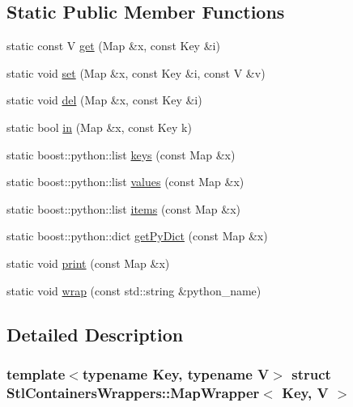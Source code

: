 \subsection*{Static Public Member Functions}
\begin{DoxyCompactItemize}
\item 
static const V \hyperlink{struct_stl_containers_wrappers_1_1_map_wrapper_a07fb2d02f615e98dea6b89eed318cf50}{get} (Map \&x, const Key \&i)
\item 
static void \hyperlink{struct_stl_containers_wrappers_1_1_map_wrapper_a96ea8db6b3798552ac56ba3528338ed1}{set} (Map \&x, const Key \&i, const V \&v)
\item 
static void \hyperlink{struct_stl_containers_wrappers_1_1_map_wrapper_a53d6b96019b6a897857456aeca41e307}{del} (Map \&x, const Key \&i)
\item 
static bool \hyperlink{struct_stl_containers_wrappers_1_1_map_wrapper_adb2320f8f6e103e8e260d8893e447922}{in} (Map \&x, const Key k)
\item 
static boost::python::list \hyperlink{struct_stl_containers_wrappers_1_1_map_wrapper_ac77b18022558a701e72fef0c590a30e5}{keys} (const Map \&x)
\item 
static boost::python::list \hyperlink{struct_stl_containers_wrappers_1_1_map_wrapper_af5fe4cddbd02adae4a550258a397e6a0}{values} (const Map \&x)
\item 
static boost::python::list \hyperlink{struct_stl_containers_wrappers_1_1_map_wrapper_a9aa475b817bbab6bc522b595c7e0a35b}{items} (const Map \&x)
\item 
static boost::python::dict \hyperlink{struct_stl_containers_wrappers_1_1_map_wrapper_ad5e7ad1b461f1693a90fcca938199382}{getPyDict} (const Map \&x)
\item 
static void \hyperlink{struct_stl_containers_wrappers_1_1_map_wrapper_ac055a7e3c344719ff196cc1d146da0a1}{print} (const Map \&x)
\item 
static void \hyperlink{struct_stl_containers_wrappers_1_1_map_wrapper_a1ac7d22751e4a35f84b5c0d5d764529b}{wrap} (const std::string \&python\_\-name)
\end{DoxyCompactItemize}


\subsection{Detailed Description}
\subsubsection*{template$<$typename Key, typename V$>$ struct StlContainersWrappers::MapWrapper$<$ Key, V $>$}

